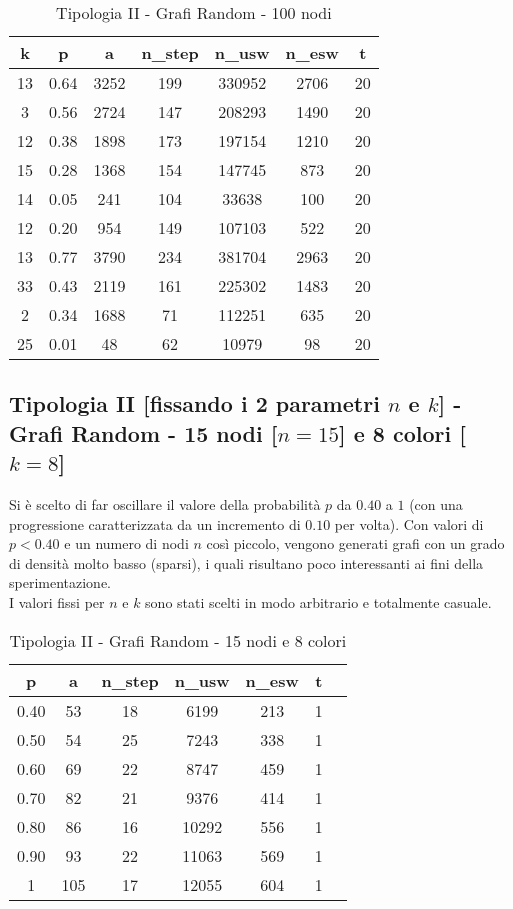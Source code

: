 \begin{table}[H]
\centering
\begin{tabular}{|c|c|c|c|c|c|c|}
\hline
\textbf{k} & \textbf{p} & \textbf{a} & \textbf{n\_step} & \textbf{n\_usw} & \textbf{n\_esw} & \textbf{t} \\ \hline
13 & 0.64 & 3252 & 199 & 330952 & 2706 & 20 \\ \hline
3 & 0.56 & 2724 & 147 & 208293 & 1490 & 20 \\ \hline
12 & 0.38 & 1898 & 173 & 197154 & 1210 & 20 \\ \hline
15 & 0.28 & 1368 & 154 & 147745 & 873 & 20 \\ \hline
14 & 0.05 & 241 & 104 & 33638 & 100 & 20 \\ \hline
12 & 0.20 & 954 & 149 & 107103 & 522 & 20 \\ \hline
13 & 0.77 & 3790 & 234 & 381704 & 2963 & 20 \\ \hline
33 & 0.43 & 2119 & 161 & 225302 & 1483 & 20 \\ \hline
2 & 0.34 & 1688 & 71 & 112251 & 635 & 20 \\ \hline
25 & 0.01 & 48 & 62 & 10979 & 98 & 20 \\ \hline
\end{tabular}
\caption{Tipologia II - Grafi Random - 100 nodi}
\label{tab:sperimentazione-tipo1-100nodi}
\end{table}

\newpage
\subsection{Tipologia II [fissando i 2 parametri $n$ e $k$] - Grafi Random - 15 nodi [$n=15$] e 8 colori [$k=8$]}
Si è scelto di far oscillare il valore della probabilità $p$ da $0.40$ a $1$ (con una progressione caratterizzata da un incremento di $0.10$ per volta). Con valori di \(p<0.40\) e un numero di nodi $n$ così piccolo, vengono generati grafi con un grado di densità molto basso (sparsi), i quali risultano poco interessanti ai fini della sperimentazione.\\
I valori fissi per $n$ e $k$ sono stati scelti in modo arbitrario e totalmente casuale.

\begin{table}[H]
\centering
\begin{tabular}{|c|c|c|c|c|c|c|}
\hline
\textbf{p} & \textbf{a} & \textbf{n\_step} & \textbf{n\_usw} & \textbf{n\_esw} & \textbf{t} \\ \hline
0.40 & 53 & 18 & 6199 & 213 & 1 \\ \hline
0.50 & 54 & 25 & 7243 & 338 & 1 \\ \hline
0.60 & 69 & 22 & 8747 & 459 & 1 \\ \hline
0.70 & 82 & 21 & 9376 & 414 & 1 \\ \hline
0.80 & 86 & 16 & 10292 & 556 & 1 \\ \hline
0.90 & 93 & 22 & 11063 & 569 & 1 \\ \hline
1 & 105 & 17 & 12055 & 604 & 1 \\ \hline
\end{tabular}
\caption{Tipologia II - Grafi Random - 15 nodi e 8 colori}
\label{tab:sperimentazione-tipo1-15nodi8colori}
\end{table}

